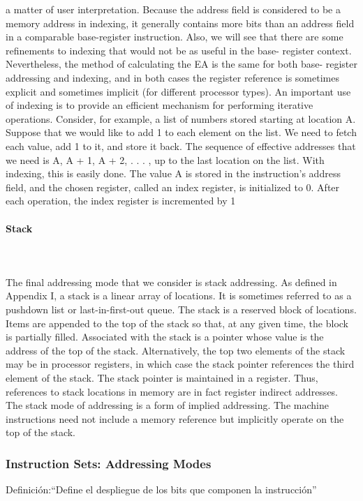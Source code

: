 	a matter of user interpretation. Because the address field is considered to be a
	memory address in indexing, it generally contains more bits than an address field
	in a comparable base-register instruction. Also, we will see that there are some
	refinements to indexing that would not be as useful in the base-
	register context.
	Nevertheless, the method of calculating the EA is the same for both base-
	register addressing and indexing, and in both cases the register reference is sometimes
	explicit and sometimes implicit (for different processor types).
	An important use of indexing is to provide an efficient mechanism for performing
	iterative operations. Consider, for example, a list of numbers stored starting
	at location A. Suppose that we would like to add 1 to each element on the list.
	We need to fetch each value, add 1 to it, and store it back. The sequence of effective
	addresses that we need is A, A + 1, A + 2, . . . , up to the last location on the list.
	With indexing, this is easily done. The value A is stored in the instruction’s address
	field, and the chosen register, called an index register, is initialized to 0. After each
	operation, the index register is incremented by 1
\paragraph{Stack}\mbox{}\\\\%
The final addressing mode that we consider is stack addressing. As defined in
Appendix I, a stack is a linear array of locations. It is sometimes referred to as a
pushdown list or last-in-first-out queue. The stack is a reserved block of locations.
Items are appended to the top of the stack so that, at any given time, the block is partially filled. Associated with the stack is a pointer whose value is the address of the
top of the stack. Alternatively, the top two elements of the stack may be in processor
registers, in which case the stack pointer references the third element of the stack.
The stack pointer is maintained in a register. Thus, references to stack locations in
memory are in fact register indirect addresses.
The stack mode of addressing is a form of implied addressing. The machine
instructions need not include a memory reference but implicitly operate on the top
of the stack.


\subsubsection{Instruction Sets: Addressing Modes}
Definición:“Define el despliegue de los bits que componen la instrucción”
